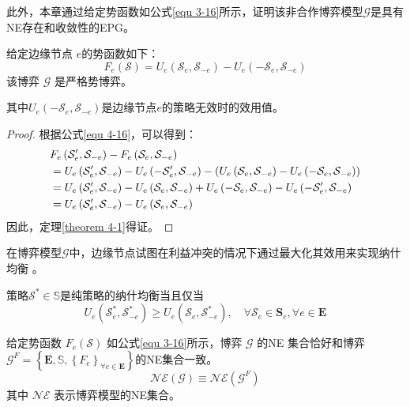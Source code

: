 此外，本章通过给定势函数如公式\ref{equ 3-16}所示，证明该非合作博弈模型$\mathcal{G}$是具有NE存在和收敛性的EPG。
\begin{theorem}
给定边缘节点 $e$的势函数如下：
\begin{equation}
	{F}_{e}\left(\mathcal{S}\right) = {U}_{e}\left(\mathcal{S}_{e}, \mathcal{S}_{-e}\right) - {U}_{e}\left(-\mathcal{S}_{e}, \mathcal{S}_{-e}\right)
	\label{equ 3-16}
\end{equation}
该博弈 $\mathcal{G}$ 是严格势博弈。
\label{theorem 4-1}
\end{theorem}
\noindent 其中${U}_{e}\left(-\mathcal{S}_{e}, \mathcal{S}_{-e}\right)$是边缘节点$e$的策略无效时的效用值。
\begin{proof} 根据公式\ref{equ 4-16}，可以得到：
\begin{align}
&{F}_{e}\left(\mathcal{{S}}^{\prime}_{e}, \mathcal{S}_{-e}\right) - {F}_{e}\left(\mathcal{S}_{e}, \mathcal{S}_{-e}\right) \notag \\
		&={U}_{e}\left(\mathcal{S}^{\prime}_{e}, \mathcal{S}_{-e}\right) - {U}_{e}\left(-\mathcal{S}^{\prime}_{e}, \mathcal{S}_{-e}\right) - \left( {U}_{e}\left(\mathcal{S}_{e}, \mathcal{S}_{-e}\right) - {U}_{e}\left(-\mathcal{S}_{e}, \mathcal{S}_{-e}\right) \right) \notag \\
		&={U}_{e}\left(\mathcal{S}^{\prime}_{e}, \mathcal{S}_{-e}\right) - {U}_{e}\left(\mathcal{S}_{e}, \mathcal{S}_{-e}\right) + {U}_{e}\left(-\mathcal{S}_{e}, \mathcal{S}_{-e}\right) - {U}_{e}\left(-\mathcal{S}^{\prime}_{e}, \mathcal{S}_{-e}\right) \notag \\
		&={U}_{e}\left(\mathcal{S}^{\prime}_{e}, \mathcal{S}_{-e}\right) - {U}_{e}\left(\mathcal{S}_{e}, \mathcal{S}_{-e}\right)
\end{align}
因此，定理\ref{theorem 4-1}得证。
\end{proof}
\noindent 在博弈模型$\mathcal{G}$中，边缘节点试图在利益冲突的情况下通过最大化其效用来实现纳什均衡 \cite{chew2016potential}。
\begin{definition}
策略$\mathcal{S}^{*} \in \mathbb{S}$是纯策略的纳什均衡\cite{chew2016potential}当且仅当
	\begin{equation}
		U_{e}\left(\mathcal{S}_{e}^{*}, \mathcal{S}_{-e}^{*}\right) \geq U_{e}\left(\mathcal{S}_{e}, \mathcal{S}_{-e}^{*}\right), \quad \forall \mathcal{S}_{e} \in \mathbf{S}_{e}, \forall e \in \mathbf{E}
	\end{equation}
\end{definition}
\begin{lemma}
	给定势函数 $F_{e}(\mathcal{S})$ 如公式\ref{equ 3-16}所示，博弈 $\mathcal{G}$ 的NE 集合恰好和博弈$\mathcal{G}^{F}=\left\{\mathbf{E}, \mathbb{S}, \left\{{F}_{e}\right\}_{\forall e \in \mathbf{E}} \right\}$的NE集合一致。
	\begin{equation}
		\mathcal{NE}(\mathcal{G}) \equiv \mathcal{NE}\left(\mathcal{G}^{F}\right)
	\end{equation}
	其中 $\mathcal{NE}$ 表示博弈模型的NE集合。
\label{lemma 4-1}
\end{lemma}
